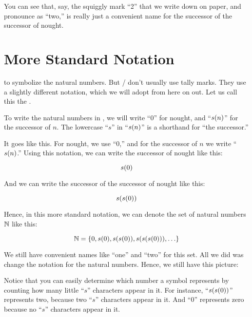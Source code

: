 \documentclass[../../../main.tex]{subfiles}
\begin{document}
You can see that, say, the squiggly mark ``2'' that we write down on paper, and pronounce as ``two,'' is really just a convenient name for the successor of the successor of nought.


\section{More Standard Notation}

 to symbolize the natural numbers. But \mathers/ don't usually use tally marks. They use a slightly different notation, which we will adopt from here on out. Let us call this the .

\begin{terminology}
  To write the natural numbers in , we will write ``$0$'' for nought, and ``$s(n)$'' for the successor of $n$. The lowercase ``$s$'' in ``$s(n)$'' is a shorthand for ``the successor.''
\end{terminology}

It goes like this. For nought, we use ``$0$,'' and for the successor of $n$ we write ``$s(n)$.'' Using this notation, we can write the successor of nought like this:

\begin{equation*}
  s(0)
\end{equation*} 

And we can write the successor of the successor of nought like this:

\begin{equation*}
  s(s(0))
\end{equation*} 

Hence, in this more standard notation, we can denote the set of natural numbers $\Nats/$ like this:

\begin{equation*}
  \Nats/ = \{ 0, \s{0}, \s{\s{0}}, \s{\s{\s{0}}}, \ldots \}
\end{equation*}

We still have convenient names like ``one'' and ``two'' for this set. All we did was change the notation for the natural numbers. Hence, we still have this picture:

\begin{aside}
  \begin{remark}
    Notice that you can easily determine which number a symbol represents by counting how many little ``$s$'' characters appear in it. For instance, ``$s(s(0))$'' represents two, because two ``$s$'' characters appear in it. And ``$0$'' represents zero because no ``$s$'' characters appear in it.
  \end{remark}
\end{aside}
\end{document}
